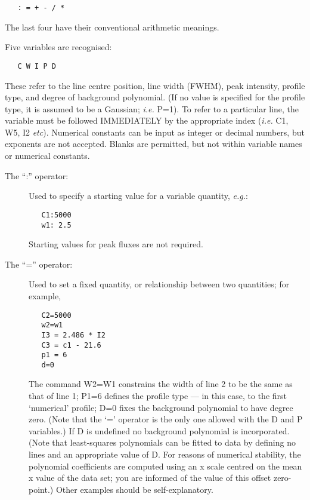 \documentclass[twoside,11pt]{article}
\renewcommand{\_}{\texttt{\symbol{95}}}
\begin{document}
\begin {description}
\begin{verbatim}
   : = + - / *
\end{verbatim}

The last four have their conventional arithmetic meanings.

Five variables are recognised:

\begin{verbatim}
   C W I P D
\end{verbatim}

These refer to the line centre position, line width (FWHM), peak
intensity, profile type, and degree of background polynomial. (If no
value is specified for the profile type, it is assumed to be a
Gaussian; {\em i.e.} P=1). To refer to a particular line, the variable
must be followed IMMEDIATELY by the appropriate index ({\em i.e.} C1,
W5, I2 {\em etc}). Numerical constants can be input as integer or decimal
numbers, but exponents are not accepted. Blanks are permitted, but not
within variable names or numerical constants.

\begin{description}

\item [The ``:'' operator:]

Used to specify a starting value for a variable quantity, {\em e.g.}:

\begin{verbatim}
   C1:5000
   w1: 2.5
\end{verbatim}

Starting values for peak fluxes are not required.

\item [The ``='' operator:]

Used to set a fixed quantity, or relationship between two quantities; for
example,

\begin{verbatim}
   C2=5000
   w2=w1
   I3 = 2.486 * I2
   C3 = c1 - 21.6
   p1 = 6
   d=0
\end{verbatim}

The command W2=W1 constrains the width of line 2 to be the same as
that of line 1; P1=6 defines the profile type --- in this case, to the
first `numerical' profile; D=0 fixes the background polynomial to have
degree zero. (Note that the `=' operator is the only one allowed with
the D and P variables.) If D is undefined no background polynomial is
incorporated. (Note that least-squares polynomials can be fitted to
data by defining no lines and an appropriate value of D. For reasons
of numerical stability, the polynomial coefficients are computed using
an x scale centred on the mean x value of the data set; you are
informed of the value of this offset zero-point.) Other examples
should be self-explanatory.


\end{description}
\end{description}
\end{document}
